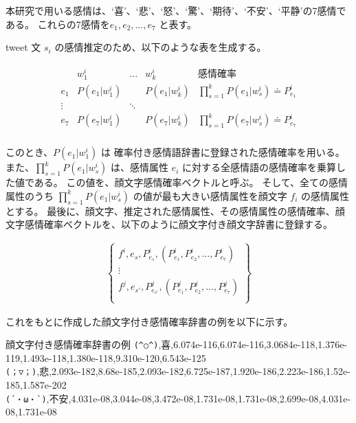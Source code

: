 \documentclass[11pt,a4j]{jsarticle}
\begin{document}
本研究で用いる感情は、`喜'、`悲'、`怒'、`驚'、`期待'、`不安'、`平静'の7感情である。
これらの7感情を$e_1, e_2, \ldots, e_7$ と表す。

tweet 文 $s_i$ の感情推定のため、以下のような表を生成する。

\begin{eqnarray*}
  \begin{array}{r|ccc|l}
        & w^i_1              & \ldots          & w^{i}_{k}    & 感情確率 \\ \hline
    e_1 & P(e_1|w^i_1) &                 & P(e_1|w^i_k) & \prod_{s=1}^{k}P(e_1|w^i_s) \doteq P^i_{e_1}\\
    \vdots             &                 & \ddots       &                                           & \\
    e_7 & P(e_7|w^i_1) &                 & P(e_7|w^i_k) & \prod_{s=1}^{k}P(e_7|w^i_s) \doteq P^i_{e_7}\\
  \end{array}
\end{eqnarray*}


このとき、$P(e_1|w^i_1)$ は 確率付き感情語辞書に登録された感情確率を用いる。
また、$\prod_{s=1}^{k}P(e_1|w^i_s)$ は、感情属性 $e_i$ に対する全感情語の感情確率を乗算した値である。
この値を、顔文字感情確率ベクトルと呼ぶ。
そして、全ての感情属性のうち $\prod_{s=1}^{k}P(e_1|w^i_s)$ の値が最も大きい感情属性を顔文字 $f_i$ の感情属性とする。
最後に、顔文字、推定された感情属性、その感情属性の感情確率、顔文字感情確率ベクトルを、以下のように顔文字付き顔文字辞書に登録する。

\begin{eqnarray*}
  \left\{
   \begin{array}{c}
     f^i, e_s, P^i_{e_s}, (P^i_{e_1}, P^i_{e_2}, \ldots, P^i_{e_7})\\
     \vdots \\
     f^j, e_{s'}, P^j_{e_{s'}}, (P^j_{e_1}, P^j_{e_2}, \ldots, P^j_{e_7})\\
   \end{array}
  \right\}
\end{eqnarray*}


これをもとに作成した顔文字付き感情確率辞書の例を以下に示す。

\begin{itembox}[l]{顔文字付き感情確率辞書の例}
\verb|(^○^)|,喜,6.074e-116,6.074e-116,3.0684e-118,1.376e-119,1.493e-118,1.380e-118,9.310e-120,6.543e-125\\
\verb|(；▽；)|,悲,2.093e-182,8.68e-185,2.093e-182,6.725e-187,1.920e-186,2.223e-186,1.52e-185,1.587e-202\\
\verb|(´・ω・`)|,不安,4.031e-08,3.044e-08,3.472e-08,1.731e-08,1.731e-08,2.699e-08,4.031e-08,1.731e-08\\
\end{itembox}
\end{document}
